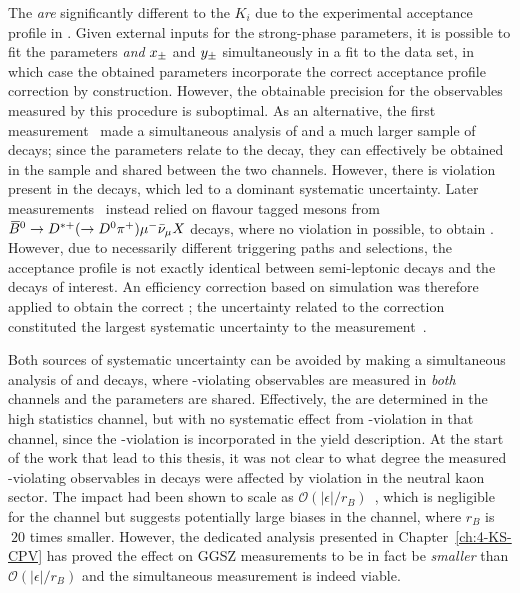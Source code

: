 The \Fi \emph{are} significantly different to the $K_i$ due to the experimental acceptance profile in \lhcb. Given external inputs for the strong-phase parameters, it is possible to fit the \Fi parameters \emph{and} $x_\pm$ and $y_\pm$ simultaneously in a fit to the \lhcb \BtoDK data set, in which case the obtained \Fi parameters incorporate the correct acceptance profile correction by construction. However, the obtainable precision for the \CP observables measured by this procedure is suboptimal. As an alternative, the first \lhcb measurement~\cite{LHCb-PAPER-2012-027} made a simultaneous analysis of \BtoDK and a much larger sample of \BtoDpi decays; since the \Fi parameters relate to the \D decay, they can effectively be obtained in the \Dpi sample  and shared between the two \BtoDh channels. However, there is \CP violation present in the \BtoDpi decays, which led to a dominant systematic uncertainty. Later \lhcb measurements~\cite{LHCb-PAPER-2014-041,LHCb-PAPER-2018-017} instead relied on flavour tagged \D mesons from ${{\kern 0.18em\overline{\kern -0.18em B}}{}^0}\rightarrow{\ensuremath{{D}^{*+}}}(\rightarrow {\ensuremath{{D}^0}} {\ensuremath{{\pi}^+}})\mu^- \bar \nu_\mu X$ decays, where no \CP violation in possible, to obtain \Fi. However, due to necessarily different triggering paths and selections, the acceptance profile is not exactly identical between semi-leptonic decays and the \BtoDh decays of interest. An efficiency correction based on simulation was therefore applied to obtain the correct \Fi; the uncertainty related to the correction constituted the largest systematic uncertainty to the measurement~\cite{}.

Both sources of systematic uncertainty can be avoided by making a simultaneous analysis of \BtoDK and \BtoDpi decays, where \CP-violating observables are measured in \emph{both} channels and the \Fi parameters are shared. Effectively, the \Fi are determined in the high statistics \BtoDpi channel, but with no systematic effect from \CP-violation in that channel, since the \CP-violation is incorporated in the yield description. At the start of the work that lead to this thesis, it was not clear to what degree the measured \CP-violating observables in \BtoDpi decays were affected by \CP violation in the neutral kaon sector. The impact had been shown to scale as $\mathcal O(|\epsilon| / r_B)$~\cite{grossmanEffectsBarMixing2014}, which is negligible for the \BtoDK channel but suggests potentially large biases in the \BtoDpi channel, where $r_B$ is $~20$ times smaller. However, the dedicated analysis presented in Chapter~\ref{ch:4-KS-CPV} has proved the effect on GGSZ measurements to be in fact be \emph{smaller} than $\mathcal O(|\epsilon| / r_B)$ and the simultaneous measurement is indeed viable. 

